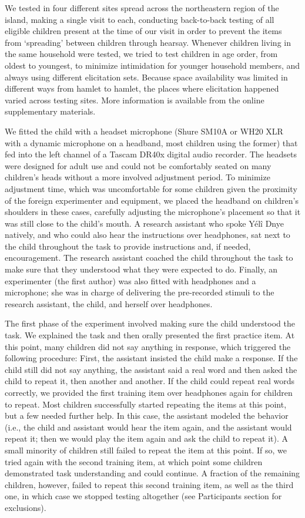 \documentclass[
  english,
  ,man,floatsintext]{apa6}
\begin{document}
We tested in four different sites spread across the northeastern region of the island, making a single visit to each, conducting back-to-back testing of all eligible children present at the time of our visit in order to prevent the items from `spreading' between children through hearsay. Whenever children living in the same household were tested, we tried to test children in age order, from oldest to youngest, to minimize intimidation for younger household members, and always using different elicitation sets. Because space availability was limited in different ways from hamlet to hamlet, the places where elicitation happened varied across testing sites. More information is available from the online supplementary materials.

We fitted the child with a headset microphone (Shure SM10A or WH20 XLR with a dynamic microphone on a headband, most children using the former) that fed into the left channel of a Tascam DR40x digital audio recorder. The headsets were designed for adult use and could not be comfortably seated on many children's heads without a more involved adjustment period. To minimize adjustment time, which was uncomfortable for some children given the proximity of the foreign experimenter and equipment, we placed the headband on children's shoulders in these cases, carefully adjusting the microphone's placement so that it was still close to the child's mouth. A research assistant who spoke Yélî Dnye natively, and who could also hear the instructions over headphones, sat next to the child throughout the task to provide instructions and, if needed, encouragement. The research assistant coached the child throughout the task to make sure that they understood what they were expected to do. Finally, an experimenter (the first author) was also fitted with headphones and a microphone; she was in charge of delivering the pre-recorded stimuli to the research assistant, the child, and herself over headphones.

The first phase of the experiment involved making sure the child understood the task. We explained the task and then orally presented the first practice item. At this point, many children did not say anything in response, which triggered the following procedure: First, the assistant insisted the child make a response. If the child still did not say anything, the assistant said a real word and then asked the child to repeat it, then another and another. If the child could repeat real words correctly, we provided the first training item over headphones again for children to repeat. Most children successfully started repeating the items at this point, but a few needed further help. In this case, the assistant modeled the behavior (i.e., the child and assistant would hear the item again, and the assistant would repeat it; then we would play the item again and ask the child to repeat it). A small minority of children still failed to repeat the item at this point. If so, we tried again with the second training item, at which point some children demonstrated task understanding and could continue. A fraction of the remaining children, however, failed to repeat this second training item, as well as the third one, in which case we stopped testing altogether (see Participants section for exclusions).
\end{document}
